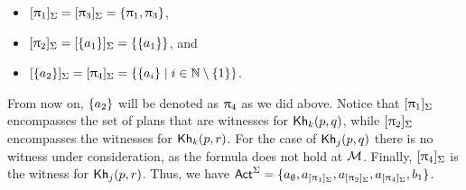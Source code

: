 \begin{example}
\begin{itemize}
    \item $[\uppi_1]_\Sigma = [\uppi_3]_\Sigma = \{ \uppi_1,\uppi_3 \}$,
    \item $[\uppi_2]_\Sigma = [\{ a_1 \}]_\Sigma= \{ \{ a_1 \} \}$, and 
    \item $[\{ a_2 \}]_\Sigma = [\uppi_4]_\Sigma = \{ \{ a_i \} \mid i \in \mathbb{N}\setminus\{ 1 \} \}$.
\end{itemize}

From now on, $\{ a_2 \}$ will be denoted as $\uppi_4$ as we did above. 
Notice that $[\uppi_1]_\Sigma$ encompasses the set of plans that are witnesses for ${\sf Kh}_k(p,q)$, while $[\uppi_2]_\Sigma$ encompasses the witnesses for ${\sf Kh}_k(p,r)$. For the case of ${\sf Kh}_j(p,q)$ there is no witness under consideration, as the formula does not hold at $\mathcal{M}$.   
Finally, $[\uppi_4]_\Sigma$ is the witness for ${\sf Kh}_j(p,r)$. Thus, we have ${\rm \sf Act}^\Sigma =\{ a_\emptyset,a_{[\uppi_1]_\Sigma},a_{[\uppi_2]_\Sigma},a_{[\uppi_4]_\Sigma},b_1 \}$.


\end{example}

